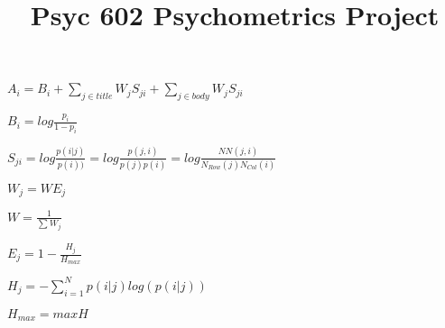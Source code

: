 \documentclass[man]{apa6}
\title{Psyc 602 Psychometrics Project}
\begin{document}
$A_{i} = B_{i} + \sum_{j\in title}^{ } W_{j} S_{ji} + \sum_{j\in body}^{ } W_{j} S_{ji}$

$B_{i} = log \frac{p_{i}}{1-p_{i}}$

$S_{ji} = log \frac{p(i|j)}{p(i))} = log \frac{p(j,i)}{p(j)p(i)} = log \frac{NN(j,i)}{N_{Row}(j)N_{Col}(i)}$

$W_{j} = WE_{j}$

$W = \frac{1}{\sum_{}^{} W_{j}}$

$E_{j} = 1-\frac{H_{j}}{H_{max}}$

$H_{j} = -\sum_{i=1}^{N}p(i|j)log\left (  p(i|j) \right )$

$H_{max} = maxH$
\end{document}
